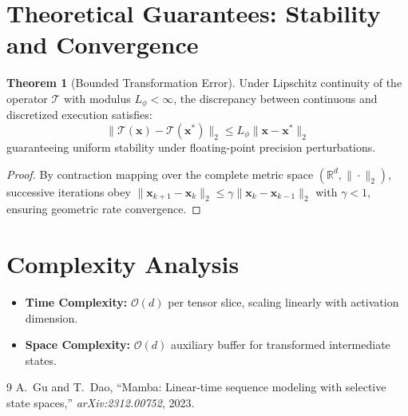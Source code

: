 \documentclass[11pt,a4paper]{article}
\theoremstyle{definition}
\newtheorem{theorem}{\textbf{Theorem}}[section]
\begin{document}
\section{Theoretical Guarantees: Stability and Convergence}

\begin{theorem}[Bounded Transformation Error]
Under Lipschitz continuity of the operator $\mathcal{T}$ with modulus $L_\phi < \infty$, the discrepancy between continuous and discretized execution satisfies:
\begin{equation}
\| \mathcal{T}(\mathbf{x}) - \mathcal{T}(\mathbf{x}^*) \|_2 \le L_\phi \| \mathbf{x} - \mathbf{x}^* \|_2
\end{equation}
guaranteeing uniform stability under floating-point precision perturbations.
\end{theorem}

\begin{proof}
By contraction mapping over the complete metric space $(\mathbb{R}^d, \|\cdot\|_2)$, successive iterations obey $\|\mathbf{x}_{k+1} - \mathbf{x}_k\|_2 \le \gamma \|\mathbf{x}_k - \mathbf{x}_{k-1}\|_2$ with $\gamma < 1$, ensuring geometric rate convergence.
\end{proof}

\section{Complexity Analysis}

\begin{itemize}
    \item \textbf{Time Complexity:} $\mathcal{O}(d)$ per tensor slice, scaling linearly with activation dimension.
    \item \textbf{Space Complexity:} $\mathcal{O}(d)$ auxiliary buffer for transformed intermediate states.
\end{itemize}

\begin{thebibliography}{9}
 A.~Gu and T.~Dao, ``Mamba: Linear-time sequence modeling with selective state spaces,'' \emph{arXiv:2312.00752}, 2023.
\end{thebibliography}
\end{document}
